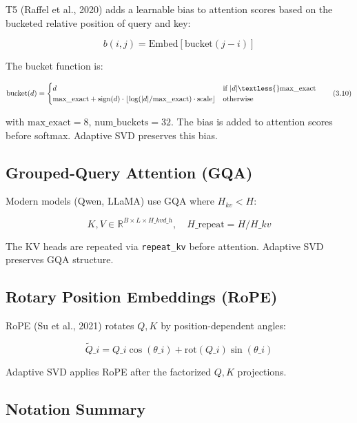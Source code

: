 T5 (Raffel et al., 2020) adds a learnable bias to attention scores based on 
the bucketed relative position of query and key:

\[
b(i, j) = \text{Embed}[\text{bucket}(j - i)]
\tag{3.9}
\]

The bucket function is:

\[
\text{bucket}(d) = \begin{cases}
d & \text{if } |d| \textless{} \text{max\_exact} \\
\text{max\_exact} + \text{sign}(d) \cdot \lfloor \log(|d| / \text{max\_exact}) \cdot \text{scale} \rfloor & \text{otherwise}
\end{cases}
\tag{3.10}
\]

with $\text{max\_exact} = 8$, $\text{num\_buckets} = 32$. The bias is added 
to attention scores before softmax. Adaptive SVD preserves this bias.

\subsection{Grouped-Query Attention (GQA)}

Modern models (Qwen, LLaMA) use GQA where $H_{kv} < H$:

\[
K, V \in \mathbb{R}^{B \times L \times H\_{kv} d\_h}, \quad H\_\text{repeat} = H / H\_{kv}
\tag{3.11}
\]

The KV heads are repeated via \texttt{repeat\_kv} before attention. Adaptive SVD 
preserves GQA structure.

\subsection{Rotary Position Embeddings (RoPE)}

RoPE (Su et al., 2021) rotates $Q, K$ by position-dependent angles:

\[
\tilde{Q}\_i = Q\_i \cos(\theta\_i) + \mathrm{rot}(Q\_i) \sin(\theta\_i)
\tag{3.12}
\]

Adaptive SVD applies RoPE after the factorized $Q, K$ projections.

\subsection{Notation Summary}
